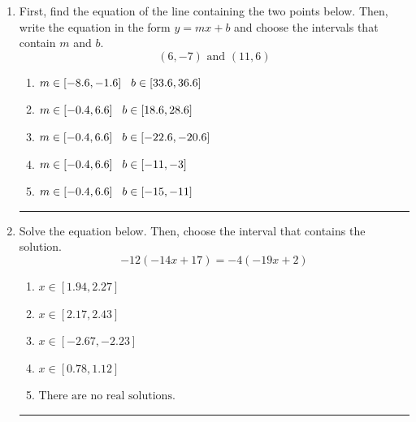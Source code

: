 \documentclass[14pt]{extbook}
\newcommand{\litem}[1]{\item#1\hspace*{-1cm}\rule{\textwidth}{0.4pt}}
\begin{document}
\begin{enumerate}
\litem{
First, find the equation of the line containing the two points below. Then, write the equation in the form $ y=mx+b $ and choose the intervals that contain $m$ and $b$.\[ (6, -7) \text{ and } (11, 6) \]\begin{enumerate}[label=\Alph*.]
\item \( m \in [-8.6, -1.6] \hspace*{3mm} b \in [33.6, 36.6] \)
\item \( m \in [-0.4, 6.6] \hspace*{3mm} b \in [18.6, 28.6] \)
\item \( m \in [-0.4, 6.6] \hspace*{3mm} b \in [-22.6, -20.6] \)
\item \( m \in [-0.4, 6.6] \hspace*{3mm} b \in [-11, -3] \)
\item \( m \in [-0.4, 6.6] \hspace*{3mm} b \in [-15, -11] \)

\end{enumerate} }
\litem{
Solve the equation below. Then, choose the interval that contains the solution.\[ -12(-14x + 17) = -4(-19x + 2) \]\begin{enumerate}[label=\Alph*.]
\item \( x \in [1.94, 2.27] \)
\item \( x \in [2.17, 2.43] \)
\item \( x \in [-2.67, -2.23] \)
\item \( x \in [0.78, 1.12] \)
\item \( \text{There are no real solutions.} \)


\end{enumerate}}
\end{enumerate}
\end{document}
